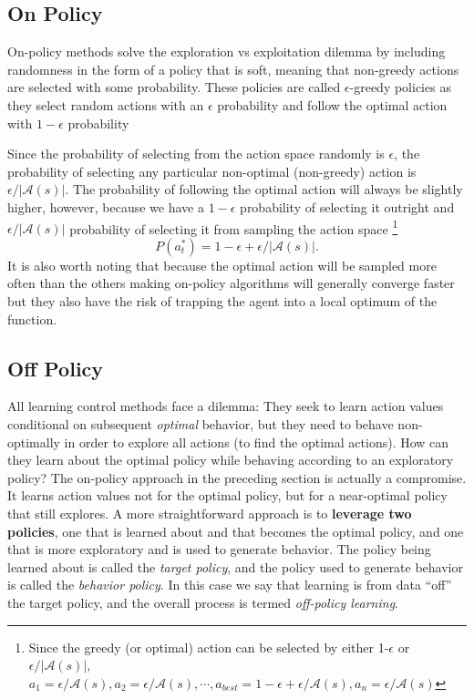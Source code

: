 \subsection{On Policy}
On-policy methods solve the exploration vs exploitation dilemma by including randomness in the form of a policy that is soft, meaning that non-greedy actions are selected with some probability. These policies are called $\epsilon$-greedy policies as they select random actions with an $\epsilon$ probability and follow the optimal action with $1-\epsilon$ probability

Since the probability of selecting from the action space randomly is $\epsilon$, the probability of selecting any particular non-optimal (non-greedy) action is $\epsilon/|\mathcal{A}(s)|$. The probability of following the optimal action will always be slightly higher, however, because we have a $1 - \epsilon$ probability of selecting it outright and $\epsilon/ |\mathcal{A}(s)|$ probability of selecting it from sampling the action space \footnote{Since the greedy (or optimal) action can be selected by either 1-$\epsilon$ or $\epsilon/ |\mathcal{A}(s)|$, $a_1=\epsilon/\mathcal{A}(s),a_2=\epsilon/\mathcal{A}(s),\cdots,a_{best}=1-\epsilon+\epsilon/\mathcal{A}(s),a_n = \epsilon/\mathcal{A}(s)$}
$$P(a_t^{*}) = 1 - \epsilon+\epsilon/ |\mathcal{A}(s)|.$$
It is also worth noting that because the optimal action will be sampled more often than the others making on-policy algorithms will generally converge faster but they also have the risk of trapping the agent into a local optimum of the function.


\subsection{Off Policy}

All learning control methods face a dilemma: They seek to learn action values conditional on subsequent \textit{optimal} behavior, but they need to behave non-optimally in order to explore all actions (to find the optimal actions). How can they learn about the optimal policy while behaving according to an exploratory policy? The on-policy approach in the preceding section is actually a compromise. It learns action values not for the optimal policy, but for a near-optimal policy that still explores. A more straightforward approach is to \textbf{leverage two policies}, one that is learned about and that becomes the optimal policy, and one that is more exploratory and is used to generate behavior. The policy being learned about is called the \textit{target policy}, and the policy used to generate behavior is called the \textit{behavior policy}. In this case we say that learning is from data ``off'' the target policy, and the overall process is termed \textit{off-policy learning}.

